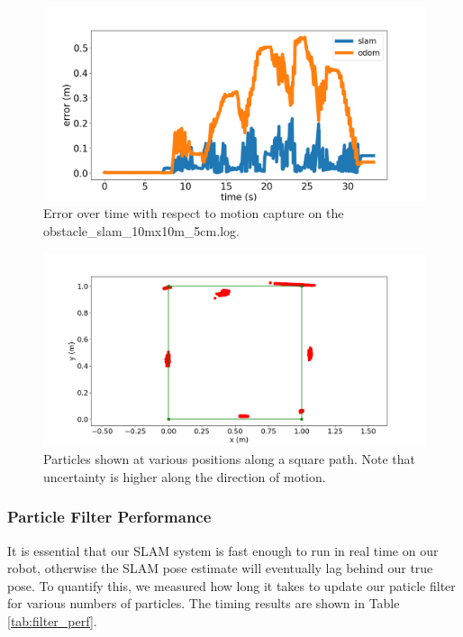 \documentclass[journal]{IEEEtran}
\begin{document}
            \begin{figure}[t]
                \centering
                \includegraphics[width=1\linewidth]{localization_error.png}
                \caption{Error over time with respect to motion capture on the obstacle\_slam\_10mx10m\_5cm.log.}
                \label{fig:localization_error}
            \end{figure}
            
        
            \begin{figure}[t]
                \centering
                \includegraphics[width=1\linewidth]{drive_square_particles.png}
                \caption{Particles shown at various positions along a square path. Note that uncertainty is higher along the direction of motion.}
                \label{fig:square_particles}
            \end{figure}
    
        \subsubsection{Particle Filter Performance}
        
            It is essential that our SLAM system is fast enough to run in real time on our robot, otherwise the SLAM pose estimate will eventually lag behind our true pose. To quantify this, we measured how long it takes to update our paticle filter for various numbers of particles. The timing results are shown in Table \ref{tab:filter_perf}.
    
\end{document}
